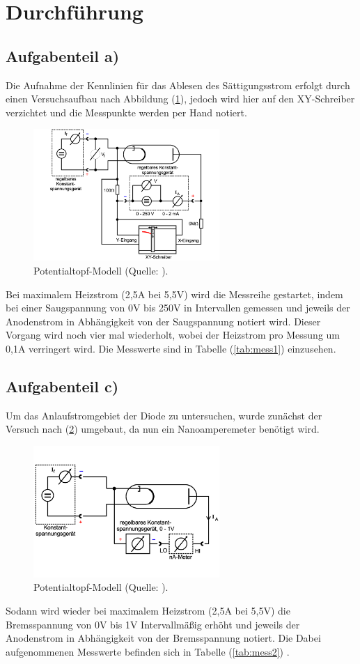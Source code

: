 \newpage
\section{Durchführung}
\subsection{Aufgabenteil a)}
Die Aufnahme der Kennlinien für das Ablesen des Sättigungsstrom erfolgt durch einen Versuchsaufbau nach Abbildung (\ref{fig:aufbau1}), 
jedoch wird hier auf den XY-Schreiber verzichtet und die Messpunkte werden per Hand notiert.

\begin{figure}
    \centering
       \includegraphics[height=5cm]{aufbau1.pdf}
       \caption{Potentialtopf-Modell (Quelle: \cite{V504}).}
       \label{fig:aufbau1}
\end{figure}

\noindent
Bei maximalem Heizstrom (2,5A bei 5,5V) wird die Messreihe gestartet, 
indem bei einer Saugspannung von 0V bis 250V in Intervallen gemessen und jeweils der Anodenstrom in Abhängigkeit von der Saugspannung notiert wird.
Dieser Vorgang wird noch vier mal wiederholt, wobei der Heizstrom pro Messung um 0,1A verringert wird.
Die Messwerte sind in Tabelle (\ref{tab:mess1})
einzusehen.

\subsection{Aufgabenteil c)}
Um das Anlaufstromgebiet der Diode zu untersuchen, wurde zunächst der Versuch nach (\ref{fig:aufbau2}) umgebaut, 
da nun ein Nanoamperemeter benötigt wird.

\begin{figure}
    \centering
       \includegraphics[height=5cm]{aufbau2.pdf}
       \caption{Potentialtopf-Modell (Quelle: \cite{V504}).}
       \label{fig:aufbau2}
\end{figure}

\noindent
Sodann wird wieder bei maximalem Heizstrom (2,5A bei 5,5V) die Bremsspannung von 0V bis 1V Intervallmäßig erhöht 
und jeweils der Anodenstrom in Abhängigkeit von der Bremsspannung notiert.
Die Dabei aufgenommenen Messwerte befinden sich in Tabelle (\ref{tab:mess2})
.